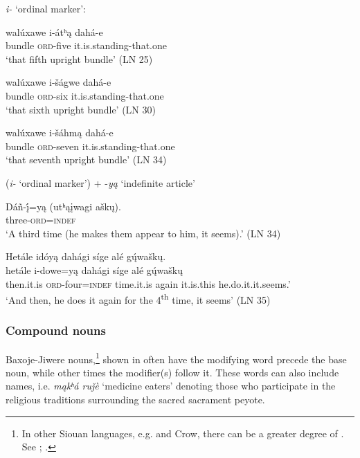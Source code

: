\documentclass[output=paper]{LSP/langsci}
\begin{document}
\begin{exe}
\ex  \textit{i-} `ordinal marker': \citep[``The Giant'' Bk2]{Marsh1936}
\begin{xlist}	
\ex 
\gll  walúxawe i-átʰ\k{a}  dahá-e   \\
bundle      \textsc{ord}-five     it.is.standing-that.one \\
\trans `that fifth upright bundle' (LN 25) 
			
\ex 
\gll  walúxawe i-\v{s}ágwe dahá-e  \\
bundle      \textsc{ord}-six     it.is.standing-that.one \\
\trans `that sixth upright bundle' (LN 30)

\ex 
\gll walúxawe  i-\v{s}áhm\k{a}  dahá-e \\  
bundle     \textsc{ord}-seven    it.is.standing-that.one \\
\trans {}`that seventh upright bundle' (LN 34)
\end{xlist}
\ex (\textit{i-} `ordinal marker') + -\textit{y\k{a}} `indefinite article' \citep[``The Wanderer'']{Marsh1936}
\begin{xlist}
\ex \gll Dáñ-\k{\'i}=y\k{a}     (utʰ\k{a}\k{i}wagi  a\v{s}k\k{u}).   \\
	three-\textsc{ord}=\textsc{indef} {} {} \\
\trans `A third time (he makes them appear to him, it seems).'	 (LN 34)  
		 
\ex 
\glll Hetále    idóy\k{a} dahági   s\'ige   alé   g\k{ú}wa\v{s}k\k{u}. \\
hetále i-dowe=y\k{a}  dahági s\'ige   alé   g\k{ú}wa\v{s}k\k{u} \\		   
then.it.is \textsc{ord}-four=\textsc{indef} time.it.is  again it.is.this he.do.it.it.seems.' \\ 
\trans `And then, he does it again for the 4\textsuperscript{th} time, it seems' (LN 35)
\end{xlist}
\end{exe}
\subsubsection{Compound nouns} 
Baxoje-Jiwere  nouns,\footnote{In other Siouan languages, e.g.  and Crow, there can be a greater degree of . See \citet[738]{Ullrich2008}; \citet{DeReuse1994,Graczyk1991a}.} shown in  often have the modifying word precede the base noun, while other times the modifier(s) follow it. These words can also include names, i.e. \textit{m\k{a}kʰá  ru\v{j}\`e} `medicine eaters' denoting those who participate in the religious traditions surrounding the sacred sacrament peyote.  
\end{document}
